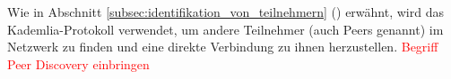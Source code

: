 
\noindent Wie in Abschnitt \ref{subsec:identifikation_von_teilnehmern} () erwähnt, wird das Kademlia-Protokoll verwendet, um andere Teilnehmer (auch Peers genannt) im Netzwerk zu finden und eine direkte Verbindung zu ihnen herzustellen. \textcolor{red}{Begriff Peer Discovery einbringen}


